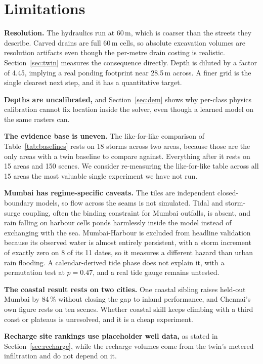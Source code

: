 \section{Limitations}
\label{sec:limits}

\textbf{Resolution.} The hydraulics run at 60\,m, which is coarser than the streets they describe.
Carved drains are full 60\,m cells, so absolute excavation volumes are resolution artifacts even
though the per-metre drain costing is realistic. Section~\ref{sec:twin} measures the consequence
directly. Depth is diluted by a factor of 4.45, implying a real ponding footprint near 28.5\,m
across. A finer grid is the single clearest next step, and it has a quantitative target.

\textbf{Depths are uncalibrated,} and Section~\ref{sec:dem} shows why per-class physics calibration
cannot fix location inside the solver, even though a learned model on the same rasters can.

\textbf{The evidence base is uneven.} The like-for-like comparison of Table~\ref{tab:baselines}
rests on 18 storms across two areas, because those are the only areas with a twin baseline to
compare against. Everything after it rests on 15 areas and 150 scenes. We consider re-measuring the
like-for-like table across all 15 areas the most valuable single experiment we have not run.

\textbf{Mumbai has regime-specific caveats.} The tiles are independent closed-boundary models, so
flow across the seams is not simulated. Tidal and storm-surge coupling, often the binding
constraint for Mumbai outfalls, is absent, and rain falling on harbour cells ponds harmlessly inside
the model instead of exchanging with the sea. Mumbai-Harbour is excluded from headline validation
because its observed water is almost entirely persistent, with a storm increment of exactly zero on
8 of its 11 dates, so it measures a different hazard than urban rain flooding. A calendar-derived
tide phase does not explain it, with a permutation test at $p = 0.47$, and a real tide gauge remains
untested.

\textbf{The coastal result rests on two cities.} One coastal sibling raises held-out Mumbai by
84\,\% without closing the gap to inland performance, and Chennai's own figure rests on ten scenes.
Whether coastal skill keeps climbing with a third coast or plateaus is unresolved, and it is a
cheap experiment.

\textbf{Recharge site rankings use placeholder well data,} as stated in Section~\ref{sec:recharge},
while the recharge volumes come from the twin's metered infiltration and do not depend on it.

